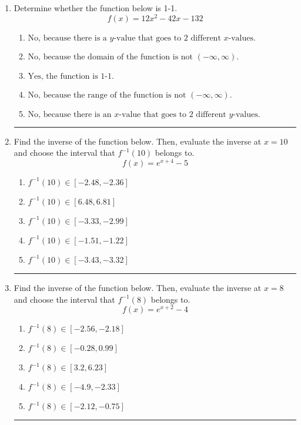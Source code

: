 \documentclass[14pt]{extbook}
\newcommand{\litem}[1]{\item#1\hspace*{-1cm}\rule{\textwidth}{0.4pt}}
\begin{document}
\begin{enumerate}
{\begin{enumerate}[label=\Alph*.]
\end{enumerate} }
\litem{
Determine whether the function below is 1-1.\[ f(x) = 12 x^2 - 42 x - 132 \]\begin{enumerate}[label=\Alph*.]
\item \( \text{No, because there is a $y$-value that goes to 2 different $x$-values.} \)
\item \( \text{No, because the domain of the function is not $(-\infty, \infty)$.} \)
\item \( \text{Yes, the function is 1-1.} \)
\item \( \text{No, because the range of the function is not $(-\infty, \infty)$.} \)
\item \( \text{No, because there is an $x$-value that goes to 2 different $y$-values.} \)

\end{enumerate} }
\litem{
Find the inverse of the function below. Then, evaluate the inverse at $x = 10$ and choose the interval that $f^{-1}(10)$ belongs to.\[ f(x) = e^{x+4}-5 \]\begin{enumerate}[label=\Alph*.]
\item \( f^{-1}(10) \in [-2.48, -2.36] \)
\item \( f^{-1}(10) \in [6.48, 6.81] \)
\item \( f^{-1}(10) \in [-3.33, -2.99] \)
\item \( f^{-1}(10) \in [-1.51, -1.22] \)
\item \( f^{-1}(10) \in [-3.43, -3.32] \)

\end{enumerate} }
\litem{
Find the inverse of the function below. Then, evaluate the inverse at $x = 8$ and choose the interval that $f^{-1}(8)$ belongs to.\[ f(x) = e^{x+2}-4 \]\begin{enumerate}[label=\Alph*.]
\item \( f^{-1}(8) \in [-2.56, -2.18] \)
\item \( f^{-1}(8) \in [-0.28, 0.99] \)
\item \( f^{-1}(8) \in [3.2, 6.23] \)
\item \( f^{-1}(8) \in [-4.9, -2.33] \)
\item \( f^{-1}(8) \in [-2.12, -0.75] \)


\end{enumerate}}
\end{enumerate}
\end{document}
